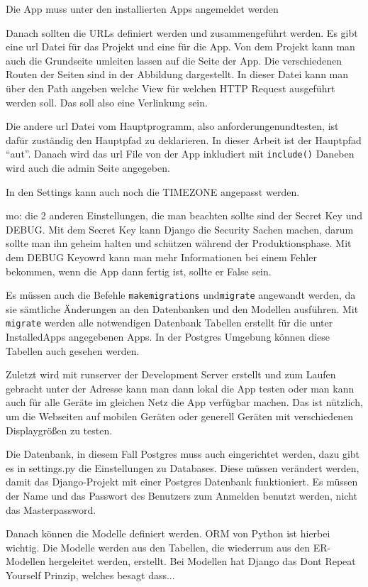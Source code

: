 \documentclass[11pt,a4paper]{report}
\begin{document}
Die App muss unter den installierten Apps angemeldet werden

Danach sollten die URLs definiert werden und zusammengeführt werden. Es gibt eine url Datei für das Projekt und eine für die App. Von dem Projekt kann man auch die Grundseite umleiten lassen auf die Seite der App. Die verschiedenen Routen der Seiten sind in der Abbildung dargestellt. 
In dieser Datei kann man über den Path angeben welche View für welchen HTTP Request ausgeführt werden soll. Das soll also eine Verlinkung sein.

Die andere url Datei vom Hauptprogramm, also anforderungenundtesten, ist dafür zuständig den Hauptpfad zu deklarieren. In dieser Arbeit ist der Hauptpfad "`aut"'. Danach wird das url File von der App inkludiert mit \verb|include()| Daneben wird auch die admin Seite angegeben.

In den Settings kann auch noch die TIMEZONE angepasst werden. 

mo: die 2 anderen Einstellungen, die man beachten sollte sind der Secret Key und DEBUG. Mit dem Secret Key kann Django die Security Sachen machen, darum sollte man ihn geheim halten und schützen während der Produktionsphase. Mit dem DEBUG Keyowrd kann man mehr Informationen bei einem Fehler bekommen, wenn die App dann fertig ist, sollte er False sein.

Es müssen auch die Befehle \verb|makemigrations| und\verb|migrate| angewandt werden, da sie sämtliche Änderungen an den Datenbanken und den Modellen ausführen.  Mit \verb|migrate| werden alle notwendigen Datenbank Tabellen erstellt für die unter InstalledApps angegebenen Apps. In der Postgres Umgebung können diese Tabellen auch gesehen werden. 

Zuletzt wird mit runserver der Development Server erstellt und zum Laufen gebracht unter der Adresse kann man dann lokal die App testen oder man kann auch für alle Geräte im gleichen Netz die App verfügbar machen. Das ist nützlich, um die Webseiten auf mobilen Geräten oder generell Geräten mit verschiedenen Displaygrößen zu testen.

Die Datenbank, in diesem Fall Postgres muss auch eingerichtet werden, dazu gibt es in settings.py die Einstellungen zu Databases. Diese müssen verändert werden, damit das Django-Projekt mit einer Postgres Datenbank funktioniert. Es müssen der Name und das Passwort des Benutzers zum Anmelden benutzt werden, nicht das Masterpassword.  


Danach können die Modelle definiert werden. ORM von Python ist hierbei wichtig. Die Modelle werden aus den Tabellen, die wiederrum aus den ER-Modellen hergeleitet werden, erstellt. Bei Modellen hat Django das Dont Repeat Yourself Prinzip, welches besagt dass...
\end{document}
